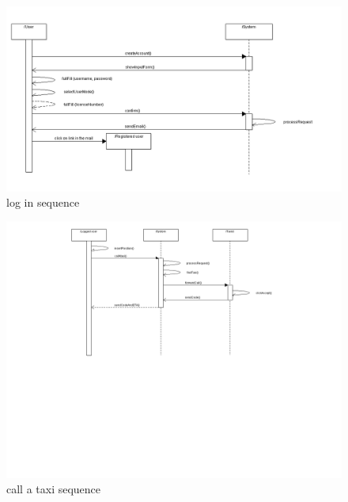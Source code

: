 \begin{center}
	\begin{figure} [h]
    	\includegraphics [scale=0.4]{sequenceregister.png}
\caption{log in sequence}
	\end{figure}
	\end{center}
	\newpage

\begin{center}
	\begin{figure} [h]
    	\includegraphics [scale=0.3]{sequencecall.png}
\caption{call a taxi sequence}
	\end{figure}
	\end{center}
	\newpage

